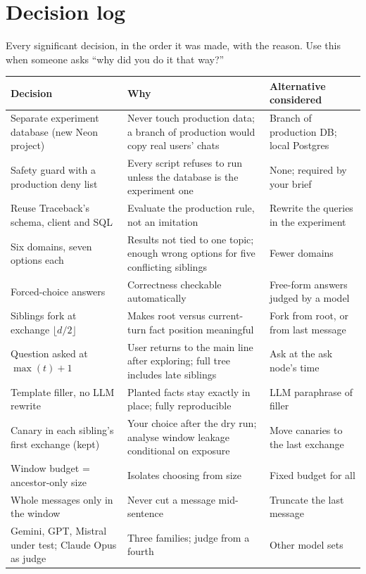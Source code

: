 \chapter{Decision log}

Every significant decision, in the order it was made, with the reason. Use this when someone asks ``why did you do it that way?''

{\small
\begin{xltabular}{\textwidth}{@{}p{3.6cm}XX@{}}
\toprule
Decision & Why & Alternative considered \\
\midrule
\endhead
Separate experiment database (new Neon project) & Never touch production data; a branch of production would copy real users' chats & Branch of production DB; local Postgres \\
Safety guard with a production deny list & Every script refuses to run unless the database is the experiment one & None; required by your brief \\
Reuse Traceback's schema, client and SQL & Evaluate the production rule, not an imitation & Rewrite the queries in the experiment \\
Six domains, seven options each & Results not tied to one topic; enough wrong options for five conflicting siblings & Fewer domains \\
Forced-choice answers & Correctness checkable automatically & Free-form answers judged by a model \\
Siblings fork at exchange $\lfloor d/2 \rfloor$ & Makes root versus current-turn fact position meaningful & Fork from root, or from last message \\
Question asked at $\max(t)+1$ & User returns to the main line after exploring; full tree includes late siblings & Ask at the ask node's time \\
Template filler, no LLM rewrite & Planted facts stay exactly in place; fully reproducible & LLM paraphrase of filler \\
Canary in each sibling's first exchange (kept) & Your choice after the dry run; analyse window leakage conditional on exposure & Move canaries to the last exchange \\
Window budget = ancestor-only size & Isolates choosing from size & Fixed budget for all \\
Whole messages only in the window & Never cut a message mid-sentence & Truncate the last message \\
Gemini, GPT, Mistral under test; Claude Opus as judge & Three families; judge from a fourth & Other model sets \\

\end{xltabular}}
